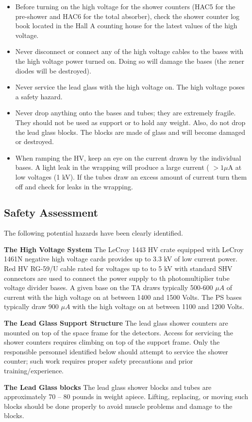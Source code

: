 \documentclass[12pt]{article}
\begin{document}
\begin{itemize}
\item{Before turning on the high voltage for the shower counters (HAC5 
for the pre-shower and HAC6 for the total absorber), check the shower
counter log book located in the Hall A counting house for the latest
values of the high voltage.}

\item{Never disconnect or connect any of the high voltage cables to 
the bases with the high voltage power turned on.  Doing so will damage
the bases (the zener diodes will be destroyed).}

\item{Never service the lead glass with the high voltage on.  The
high voltage poses a safety hazard.}

\item{Never drop anything onto the bases and tubes; they are 
extremely fragile.  They should not be used as support or to hold any
weight.  Also, do not drop the lead glass blocks.  The blocks are made
of glass and will become damaged or destroyed.}

\item{When ramping the HV, keep an eye on the current drawn 
by the individual bases.  A light leak in the wrapping will produce a
large current ( $ > 1 \mu$A at low voltages (1 kV).  If the tubes
draw an excess amount of current turn them off and check for leaks
in the wrapping.}
\end{itemize}
%

\subsection{Safety Assessment}
The following potential hazards have been clearly identified.
\begin{description}
\item {\bf The High Voltage System} The LeCroy 1443 HV crate equipped
with LeCroy 1461N negative high voltage cards provides up to 3.3 kV of
low current power.  Red HV RG-59/U cable rated for voltages up to to 5
kV with standard SHV connectors are used to connect the power supply to
th photomultiplier tube voltage divider bases.  A given base on the
TA draws typically 500-600 $\mu A$ of current with the high voltage
on at between 1400 and 1500 Volts.  The PS bases typically draw 900
$\mu A$  with the high voltage on at between 1100 and 1200 Volts.
%
\item {\bf The Lead Glass Support Structure}
The lead glass shower counters are mounted on top of the space
frame for the detectors.  Access for servicing the shower counters
requires climbing on top of the support frame.  Only the responsible
personnel identified below should attempt to service the shower counter;
such work requires proper safety precautions and prior training/experience.
\item {\bf The Lead Glass blocks}
The lead glass shower blocks and tubes are approximately 70 -- 80 pounds
in weight apiece.  Lifting, replacing, or moving such blocks should
be done properly to avoid muscle problems and damage to the blocks.
\end{description}
%
\end{document}
